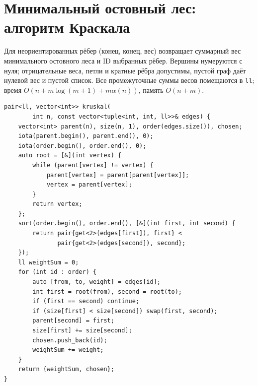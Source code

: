 \section{Минимальный остовный лес: алгоритм Краскала}
Для неориентированных рёбер (конец, конец, вес) возвращает суммарный вес минимального остовного леса и ID выбранных рёбер.
Вершины нумеруются с нуля; отрицательные веса, петли и кратные рёбра допустимы, пустой граф даёт нулевой вес и пустой список.
Все промежуточные суммы весов помещаются в \texttt{ll}; время $O(n+m\log(m+1)+m\alpha(n))$, память $O(n+m)$.
\begin{lstlisting}[name=extra_graph_kruskal]
pair<ll, vector<int>> kruskal(
        int n, const vector<tuple<int, int, ll>>& edges) {
    vector<int> parent(n), size(n, 1), order(edges.size()), chosen;
    iota(parent.begin(), parent.end(), 0);
    iota(order.begin(), order.end(), 0);
    auto root = [&](int vertex) {
        while (parent[vertex] != vertex) {
            parent[vertex] = parent[parent[vertex]];
            vertex = parent[vertex];
        }
        return vertex;
    };
    sort(order.begin(), order.end(), [&](int first, int second) {
        return pair{get<2>(edges[first]), first} <
               pair{get<2>(edges[second]), second};
    });
    ll weightSum = 0;
    for (int id : order) {
        auto [from, to, weight] = edges[id];
        int first = root(from), second = root(to);
        if (first == second) continue;
        if (size[first] < size[second]) swap(first, second);
        parent[second] = first;
        size[first] += size[second];
        chosen.push_back(id);
        weightSum += weight;
    }
    return {weightSum, chosen};
}
\end{lstlisting}
%

